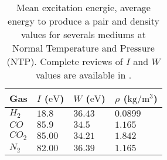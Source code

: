 \begin{table}[ht]
	\centering
	\caption[Mean excitation energie, average energy to produce a pair and density values for severals mediums at Normal Temperature and Pressure (NTP)]
	{Mean excitation energie, average energy to produce a pair and density values for severals mediums at Normal Temperature and Pressure (NTP). Complete reviews of \(I\) and \(W\) values are available in \cite{Kamakura2006}\cite{Bichsel1979}.}
	\label{chap3:WandI}
	\begin{tabular}{llll}
		\toprule
		Gas        & \(I\) (\(\mathrm{eV}\)) & \(W\) (\(\mathrm{eV}\)) & \(\rho\) (\(\mathrm{kg/m^{3}}\)) \\
		\midrule
		\(H_{2}\)  & \(18.8\)       & \(36.43\)  &  \(0.0899\)  \\
		\(CO\)     & \(85.9\)       & \(34.5\)   &  \(1.165\)  \\
		\(CO_{2}\) & \(85.00\)      & \(34.21\)  &  \(1.842\)  \\
		\(N_{2}\)  & \(82.00\)      & \(36.39\)  &  \(1.165\)  \\
		\bottomrule
	\end{tabular}
\end{table}